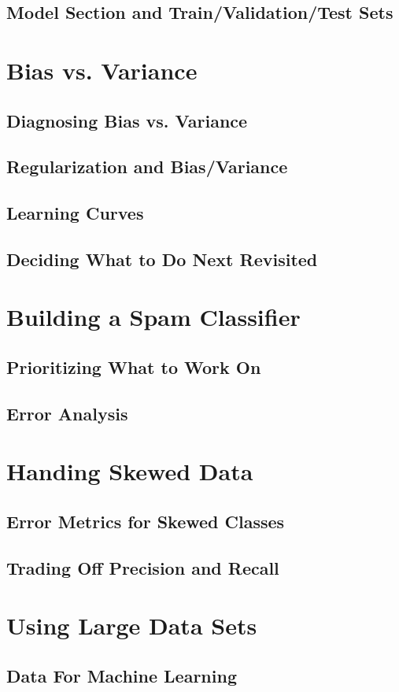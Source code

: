 \documentclass{article}
\begin{document}
\begin{CJK}{UTF8}{gbsn}
\subsection{Model Section and Train/Validation/Test Sets}
\section{Bias vs. Variance}
\subsection{Diagnosing Bias vs. Variance}
\subsection{Regularization and Bias/Variance}
\subsection{Learning Curves}
\subsection{Deciding What to Do Next Revisited}
\section{Building a Spam Classifier}
\subsection{Prioritizing What to Work On}
\subsection{Error Analysis}
\section{Handing Skewed Data}
\subsection{Error Metrics for Skewed Classes}
\subsection{Trading Off Precision and Recall}
\section{Using Large Data Sets}
\subsection{Data For Machine Learning}
\end{CJK}
\end{document}
